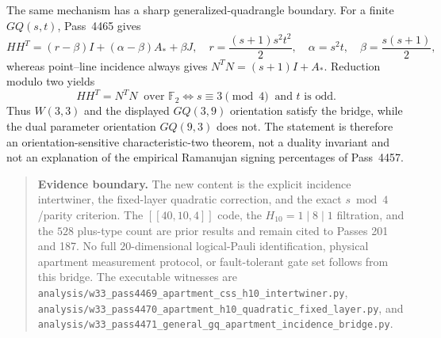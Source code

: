 The same mechanism has a sharp generalized-quadrangle boundary.  For a
finite $GQ(s,t)$, Pass~4465 gives
\[
 HH^T=(r-\beta)I+(\alpha-\beta)A_*+\beta J,
 \quad
 r=\frac{(s+1)s^2t^2}{2},\quad
 \alpha=s^2t,\quad
 \beta=\frac{s(s+1)}2,
\]
whereas point--line incidence always gives
$N^TN=(s+1)I+A_*$.  Reduction modulo two yields
\[
 \boxed{HH^T=N^TN\ \text{ over }\mathbb F_2
 \iff s\equiv3\pmod4\ \text{ and }t\text{ is odd}.}
\]
Thus $W(3,3)$ and the displayed $GQ(3,9)$ orientation satisfy the bridge,
while the dual parameter orientation $GQ(9,3)$ does not.  The statement
is therefore an orientation-sensitive characteristic-two theorem, not a
duality invariant and not an explanation of the empirical Ramanujan
signing percentages of Pass~4457.

\begin{quote}\small
\textbf{Evidence boundary.}
The new content is the explicit incidence intertwiner, the fixed-layer
quadratic correction, and the exact $s\bmod4$/parity criterion.  The
$[[40,10,4]]$ code, the $H_{10}=1\mid8\mid1$ filtration, and the $528$
plus-type count are prior results and remain cited to Passes 201 and 187.
No full $20$-dimensional logical-Pauli identification, physical apartment
measurement protocol, or fault-tolerant gate set follows from this bridge.
The executable witnesses are
\texttt{analysis/w33\_pass4469\_apartment\_css\_h10\_intertwiner.py},
\texttt{analysis/w33\_pass4470\_apartment\_h10\_quadratic\_fixed\_layer.py},
and
\texttt{analysis/w33\_pass4471\_general\_gq\_apartment\_incidence\_bridge.py}.
\end{quote}

%
